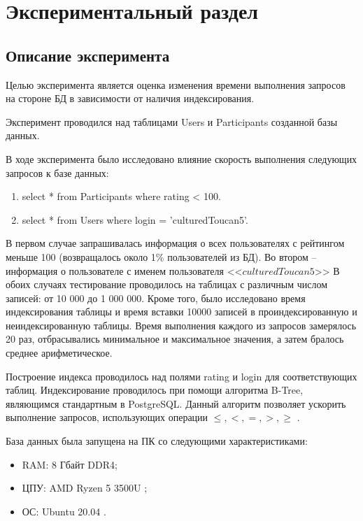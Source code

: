 \chapter{Экспериментальный раздел}

\section{Описание эксперимента}

Целью эксперимента является оценка изменения времени выполнения запросов на стороне БД в зависимости от наличия индексирования.

Эксперимент проводился над таблицами Users и Participants созданной базы данных.

В ходе эксперимента было исследовано влияние скорость выполнения следующих запросов к базе данных:
\begin{enumerate}
    \item select * from Participants where rating < 100.
    \item select * from Users where login = 'culturedToucan5'.
\end{enumerate}


В первом случае запрашивалась информация о всех пользователях с рейтингом меньше 100 (возвращалось около 1\% пользователей из БД). Во втором -- информация о пользователе с именем пользователя <<$culturedToucan5$>> В обоих случаях тестирование проводилось на таблицах с различным числом записей: от 10 000 до 1 000 000. Кроме того, было исследовано время индексирования таблицы и время вставки 10000 записей в проиндексированную и неиндексированную таблицы. Время выполнения каждого из запросов замерялось 20 раз, отбрасывались минимальное и максимальное значения, а затем бралось среднее арифметическое.

Построение индекса проводилось над полями rating и login для соответствующих таблиц. Индексирование проводилось при помощи алгоритма B-Tree, являющимся стандартным в PostgreSQL. Данный алгоритм позволяет ускорить выполнение запросов, использующих операции $\leq, <, =, >, \geq$ \cite{postgres_index}. 

База данных была запущена на ПК со следующими характеристиками:
\begin{itemize}
    \item RAM: 8 Гбайт DDR4;
    \item ЦПУ: AMD Ryzen 5 3500U \cite{amd};
    \item ОС: Ubuntu 20.04 \cite{ubuntu}.
    \end{itemize}

